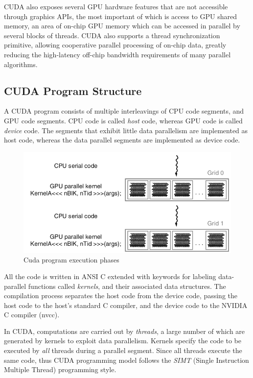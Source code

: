 \documentclass[10pt, a4paper]{report}
\begin{document}
CUDA also exposes several GPU hardware features that are not accessible through
graphics APIs, the most important of which is access to GPU shared memory, an
area of on-chip GPU memory which can be accessed in parallel by several blocks
of threads.
CUDA also supports a thread synchronization primitive, allowing cooperative
parallel processing of on-chip data, greatly reducing the high-latency off-chip
bandwidth requirements of many parallel algorithms.

\subsection{CUDA Program Structure}
A CUDA program consists of multiple interleavings of CPU code segments,
and GPU code segments.
CPU code is called \emph{host} code, whereas GPU code is called \emph{device}
code.
The segments that exhibit little data parallelism are implemented as host code,
whereas the data parallel segments are implemented as device code.

\begin{figure}[h]
\centering
\includegraphics[scale=0.35]{figs/cuda_program_execution_phases}
\caption{Cuda program execution phases}
\label{fig:cuda_program_execution_phases}
\end{figure}

All the code is written in ANSI C extended with keywords for labeling data-
parallel functions called \emph{kernels}, and their associated data structures.
The compilation process separates the host code from the device code, passing
the host code to the host's standard C compiler, and the device code to the
NVIDIA C compiler (nvcc).

In CUDA, computations are carried out by \emph{threads}, a large number of which
are generated by kernels to exploit data parallelism.
Kernels specify the code to be executed by \emph{all} threads during a parallel
segment.
Since all threads execute the same code, thus CUDA programming model follows the
\emph{SIMT} (Single Instruction Multiple Thread) programming style.
\end{document}
